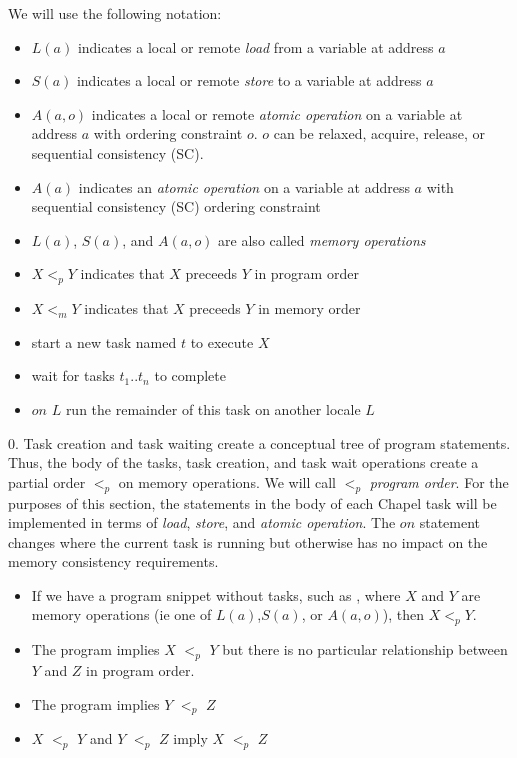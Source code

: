 We will use the following notation:
\begin{itemize}
  \item $L(a)$ indicates a local or remote \textit{load} from a variable at address $a$
  \item $S(a)$ indicates a local or remote \textit{store} to a variable at address $a$
  \item $A(a,o)$ indicates a local or remote \textit{atomic operation} on a variable at address $a$ with ordering constraint $o$. $o$ can be relaxed, acquire, release, or sequential consistency (SC).
  \item $A(a)$ indicates an \textit{atomic operation} on a variable at address $a$ with sequential consistency (SC) ordering constraint
  \item $L(a)$, $S(a)$, and $A(a,o)$ are also called \textit{memory operations}
  \item $X <_p Y$ indicates that $X$ preceeds $Y$ in program order
  \item $X <_m Y$ indicates that $X$ preceeds $Y$ in memory order
  \item {} start a new task named $t$ to execute $X$
  \item {} wait for tasks $t_1..t_n$ to complete
  \item $on$ $L$ run the remainder of this task on another locale $L$
\end{itemize}

0. Task creation and task waiting create a conceptual tree of program
statements. Thus, the body of the tasks, task creation, and task wait
operations create a partial order $<_p$ on memory operations. We will call
$<_p$ \textit{program order}. For the purposes of this section, the statements
in the body of each Chapel task will be implemented in terms of \textit{load},
\textit{store}, and \textit{atomic operation}. The $on$ statement changes where
the current task is running but otherwise has no impact on the memory
consistency requirements.

\begin{itemize}
  \item If we have a program snippet without tasks, such as , where $X$ and $Y$ are memory operations (ie one of $L(a)$,$S(a)$, or $A(a,o)$), then $X <_p Y$.
  \item The program  implies $X$ $<_p$ $Y$ but there is no particular relationship between $Y$ and $Z$ in program order.
  \item The program  implies $Y$ $<_p$ $Z$
  \item $X$ $<_p$ $Y$ and $Y$ $<_p$ $Z$ imply $X$ $<_p$ $Z$
\end{itemize}

